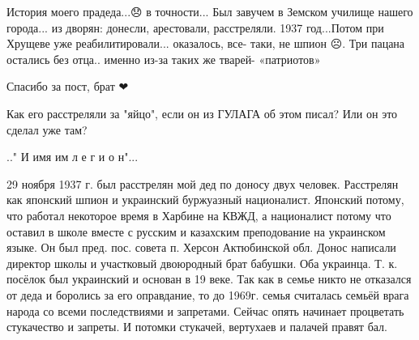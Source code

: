 \begin{itemize}

История моего прадеда...😞 в точности... Был завучем в Земском училище нашего
города... из дворян: донесли, арестовали, расстреляли. 1937 год...Потом при Хрущеве
уже реабилитировали... оказалось, все- таки, не шпион ☹️. Три пацана остались без
отца.. именно из-за таких же тварей- «патриотов»


Спасибо за пост, брат ❤

 
Как его расстреляли за "яйцо", если он из ГУЛАГА об этом писал? Или он это сделал уже там?

 
.." И имя им л е г и о н"...


\par
 

29 ноября 1937 г. был расстрелян мой дед по доносу двух человек. Расстрелян как
японский шпион и украинский буржуазный националист. Японский потому, что работал
некоторое время в Харбине на КВЖД, а националист потому что оставил в школе
вместе с русским и казахским преподование на украинском языке. Он был
пред. пос. совета п. Херсон Актюбинской обл. Донос написали директор школы и
участковый двоюродный брат бабушки. Оба украинца. Т. к. посёлок был украинский и
основан в 19 веке. Так как в семье никто не отказался от деда и боролись за его
оправдание, то до 1969г. семья считалась семьёй врага народа со всеми
последствиями и запретами. Сейчас опять начинает процветать стукачество и
запреты. И потомки стукачей, вертухаев и палачей правят бал.



\end{itemize}
